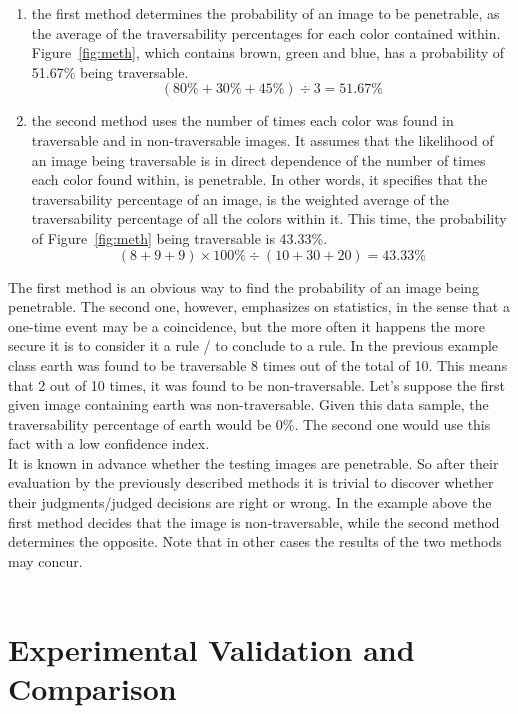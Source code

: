 \documentclass[12pt,a4paper,table,dvipsnames,tikz]{report}
\newcommand{\bl}[1]{{\hypersetup{linkcolor=blue}#1}}
\begin{document}
	\begin{enumerate}
		\item the first method determines the probability of an image to be penetrable, 
		as the average of the traversability percentages for each color contained within.
		Figure~\bl{\ref{fig:meth}}, which contains brown, green and blue, has a probability 
		of 51.67\% being traversable.
		\[ (80\% + 30\% + 45\%) \div 3 = 51.67\% \]
		\item the second method uses the number of times each color was found in traversable 
		and in non-traversable images. It assumes that the likelihood of an image being 
		traversable is in direct dependence of the number of times each color found within, 
		is penetrable. In other words, it specifies that the traversability percentage of 
		an image, is the weighted average of the traversability percentage of all the colors 
		within it. 
		This time, the probability of Figure~\bl{\ref{fig:meth}} being traversable is 43.33\%.
		\[ (8 + 9 + 9) \times 100\% \div (10 + 30 + 20) = 43.33\% \]
	\end{enumerate}
	
	The first method is an obvious way to find the probability of an image being penetrable. 
	The second one, however, emphasizes on statistics, in the sense that a one-time event  
	may be a coincidence, but the more often it happens the more secure it is to consider it 
	a rule / to conclude to a rule. In the previous example class earth was found to be 
	traversable 8 times out of the total of 10. This means that 2 out of 10 times, it was 
	found to be non-traversable. Let's suppose the first given image containing earth was 
	non-traversable. Given this data sample, the traversability percentage of earth would 
	be 0\%. The second one would use this fact with a low confidence index.
	\\
	
	It is known in advance whether the testing images are penetrable. So after their 
	evaluation by the previously described methods it is trivial to discover whether their 
	judgments/judged decisions are right or wrong. In the example above the first method decides that the 
	image is non-traversable, while the second method determines the opposite. Note that 
	in other cases the results of the two methods may concur.
	\\\\ 
	
	
	\chapter{Experimental Validation and Comparison}
	\label{sec:exp}
	
\end{document}

